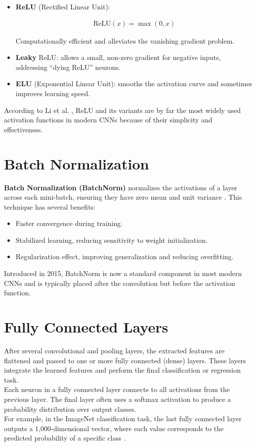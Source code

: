 \begin{itemize}
    \item \textbf{ReLU} (Rectified Linear Unit):
    
    \begin{align}
        \text{ReLU}(x) = \max(0, x)
    \end{align}
    
    Computationally efficient and alleviates the vanishing gradient problem.

    \item \textbf{Leaky} ReLU: allows a small, non-zero gradient for negative inputs, addressing “dying ReLU” neurons.

    \item \textbf{ELU} (Exponential Linear Unit): smooths the activation curve and sometimes improves learning speed.
    
\end{itemize}

According to Li et al. \cite{li2021survey}, ReLU and its variants are by far the most widely used activation functions in modern CNNs because of their simplicity and effectiveness.

\section{Batch Normalization}

\textbf{Batch Normalization (BatchNorm)} normalizes the activations of a layer across each mini-batch, ensuring they have zero mean and unit variance \cite{li2021survey}.
This technique has several benefits:
\begin{itemize}
    \item Faster convergence during training.
    \item Stabilized learning, reducing sensitivity to weight initialization.
    \item Regularization effect, improving generalization and reducing overfitting.
\end{itemize}

Introduced in 2015, BatchNorm is now a standard component in most modern CNNs and is typically placed after the convolution but before the activation function.

\section{Fully Connected Layers}

After several convolutional and pooling layers, the extracted features are flattened and passed to one or more fully connected (dense) layers.
These layers integrate the learned features and perform the final classification or regression task.
\\
Each neuron in a fully connected layer connects to all activations from the previous layer. The final layer often uses a softmax activation to produce a probability distribution over output classes.
\\
For example, in the ImageNet classification task, the last fully connected layer outputs a 1,000-dimensional vector, where each value corresponds to the predicted probability of a specific class \cite{goodfellow2016deep}.

